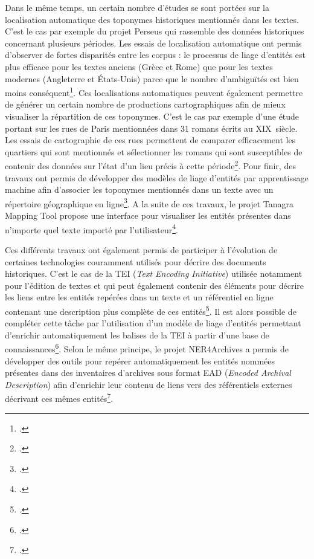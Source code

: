 \documentclass[a4paper,12pt,twoside]{book}
\begin{document}
	Dans le même temps, un certain nombre d'études se sont portées sur la localisation automatique des toponymes historiques mentionnés dans les textes. C'est le cas par exemple du projet Perseus qui rassemble des données historiques concernant plusieurs périodes. Les essais de localisation automatique ont permis d'observer de fortes disparités entre les corpus : le processus de liage d'entités est plus efficace pour les textes anciens (Grèce et Rome) que pour les textes modernes (Angleterre et États-Unis) parce que le nombre d'ambiguïtés est bien moins conséquent\footcite{goos_disambiguating_2001}. Ces localisations automatiques peuvent également permettre de générer un certain nombre de productions cartographiques afin de mieux visualiser la répartition de ces toponymes. C'est le cas par exemple d'une étude portant sur les rues de Paris mentionnées dans 31 romans écrits au XIX\ieme\ siècle. Les essais de cartographie de ces rues permettent de comparer efficacement les quartiers qui sont mentionnés et sélectionner les romans qui sont susceptibles de contenir des données sur l'état d'un lieu précis à cette période\footcite{boeglin_pour_2016}. Pour finir, des travaux ont permis de développer des modèles de liage d'entités par apprentissage machine afin d'associer les toponymes mentionnés dans un texte avec un répertoire géographique en ligne\footcite{santos_toponym_2018}. A la suite de ces travaux, le projet Tanagra Mapping Tool propose une interface pour visualiser les entités présentes dans n'importe quel texte importé par l'utilisateur\footcite{noauthor_location_nodate}.
	
	Ces différents travaux ont également permis de participer à l'évolution de certaines technologies couramment utilisés pour décrire des documents historiques. C'est le cas de la TEI (\textit{Text Encoding Initiative}) utilisée notamment pour l'édition de textes et qui peut également contenir des éléments pour décrire les liens entre les entités repérées dans un texte et un référentiel en ligne contenant une description plus complète de ces entités\footcite{frontini_annotation_2016}. Il est alors possible de compléter cette tâche par l'utilisation d'un modèle de liage d'entités permettant d'enrichir automatiquement les balises de la TEI à partir d'une base de connaissances\footcite{brando_reden_2016}. Selon le même principe, le projet NER4Archives a permis de développer des outils pour repérer automatiquement les entités nommées présentes dans des inventaires d'archives sous format EAD (\textit{Encoded Archival Description}) afin d'enrichir leur contenu de liens vers des référentiels externes décrivant ces mêmes entités\footcite{clavaud_ner4archives_nodate}.
	
\end{document}
